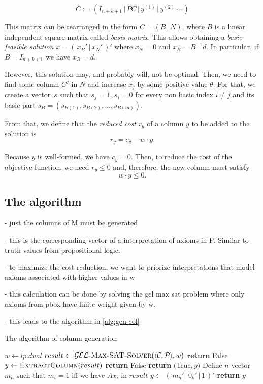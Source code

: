 \[
	C := \left( I_{n+k+1} \, | \, PC \, | \, y^{(1)} \, | \, y^{(2)} \, \cdots \, \right)
\]

This matrix can be rearranged in the form $C = (B \, | \, N)$, where $B$ is a linear independent square matrix called \emph{basis matrix}. This allows obtaining a \emph{basic feasible solution} $x = (\, x_B' \, | \, x_N' \,)'$ where $x_N = 0$ and $x_B = B^{-1}d$. In particular, if $B = I_{n+k+1}$ we have $x_B = d$.


However, this solution may, and probably will, not be optimal. Then, we need to find some column $C^j$ in $N$ and increase $x_j$ by some positive value $\theta$. For that, we create a vector~$s$ such that $s_j = 1$, $s_i = 0$ for every non basic index $i \neq j$ and its basic part $s_B = (s_{B(1)}, s_{B(2)}, \dots, s_{B(m)})$. 


From that, we define that the \emph{reduced cost} $r_y$ of a column $y$ to be added to the solution is
\[
	r_y = c_y - w \cdot y.	
\]  

Because $y$ is well-formed, we have $c_y = 0$. Then, to reduce the cost of the objective function, we need $r_y \leq 0$ and, therefore, the new column must satisfy
\[
	w \cdot y \leq 0.	
\]

\subsection{The algorithm}

- just the columns of M must be generated

- this is the corresponding vector of a interpretation of axioms in P. Similar to truth values from propositional logic.

- to maximize the cost reduction, we want to priorize interpretations that model axioms associated with higher values in w

- this calculation can be done by solving the gel max sat problem where only axioms from pbox have finite weight given by w. 

- this leads to the algorithm in \autoref{alg:gen-col}

\begin{algorithm}
	\caption{The algorithm of column generation}
  	\label{alg:gen-col}
	\begin{algorithmic}[1]
			\State $w \gets lp.dual$
			\State $result \gets \Call{$\gel$-Max-SAT-Solver}{\tuple{\CC, \PP}, w}$ 
				\State \textbf{return} False 
			\EndIf
			\Statex
			\State $y \gets \Call{ExtractColumn}{result}$
				\State \textbf{return} False 
			\EndIf
			\Statex
			\State \textbf{return} $($True$, y)$ 
		\EndFunction
		\Statex
			\State Define $n$-vector $m_n$ such that $m_i = 1$ iff we have $Ax_i$ in $result$
			\State $y \gets (\, m_n' \, | \, 0_k' \, |\, 1 \,)'$
			\State \textbf{return} $y$
		\EndFunction
	\end{algorithmic}
\end{algorithm}


